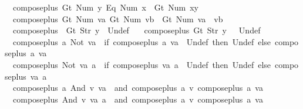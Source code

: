 \begin{isabellebody}
\ \ {\isachardoublequoteopen}compose{\isacharunderscore}plus\ {\isacharparenleft}Gt\ {\isacharparenleft}Num\ y{\isacharparenright}{\isacharparenright}\ {\isacharparenleft}Eq\ {\isacharparenleft}Num\ x{\isacharparenright}{\isacharparenright}\ {\isacharequal}\ Gt\ {\isacharparenleft}Num\ {\isacharparenleft}x{\isacharplus}y{\isacharparenright}{\isacharparenright}{\isachardoublequoteclose}\ {\isacharbar}\isanewline
\ \ {\isachardoublequoteopen}compose{\isacharunderscore}plus\ {\isacharparenleft}Gt\ {\isacharparenleft}Num\ va{\isacharparenright}{\isacharparenright}\ {\isacharparenleft}Gt\ {\isacharparenleft}Num\ vb{\isacharparenright}{\isacharparenright}\ {\isacharequal}\ Gt\ {\isacharparenleft}Num\ {\isacharparenleft}va\ {\isacharplus}\ vb{\isacharparenright}{\isacharparenright}{\isachardoublequoteclose}\ {\isacharbar}\isanewline
\ \ {\isachardoublequoteopen}compose{\isacharunderscore}plus\ {\isacharunderscore}\ {\isacharparenleft}Gt\ {\isacharparenleft}Str\ y{\isacharparenright}{\isacharparenright}\ {\isacharequal}\ Undef{\isachardoublequoteclose}\ {\isacharbar}\isanewline
\ \ {\isachardoublequoteopen}compose{\isacharunderscore}plus\ {\isacharparenleft}Gt\ {\isacharparenleft}Str\ y{\isacharparenright}{\isacharparenright}\ {\isacharunderscore}\ {\isacharequal}\ Undef{\isachardoublequoteclose}\ {\isacharbar}\isanewline
\ \ {\isachardoublequoteopen}compose{\isacharunderscore}plus\ a\ {\isacharparenleft}Not\ va{\isacharparenright}\ {\isacharequal}\ {\isacharparenleft}if\ {\isacharparenleft}compose{\isacharunderscore}plus\ a\ va{\isacharparenright}\ {\isacharequal}\ Undef\ then\ Undef\ else\ {\isacharparenleft}compose{\isacharunderscore}plus\ a\ va{\isacharparenright}{\isacharparenright}{\isachardoublequoteclose}\ {\isacharbar}\isanewline
\ \ {\isachardoublequoteopen}compose{\isacharunderscore}plus\ {\isacharparenleft}Not\ va{\isacharparenright}\ a\ {\isacharequal}\ {\isacharparenleft}if\ {\isacharparenleft}compose{\isacharunderscore}plus\ va\ a{\isacharparenright}\ {\isacharequal}\ Undef\ then\ Undef\ else\ {\isacharparenleft}compose{\isacharunderscore}plus\ va\ a{\isacharparenright}{\isacharparenright}{\isachardoublequoteclose}\ {\isacharbar}\isanewline
\ \ {\isachardoublequoteopen}compose{\isacharunderscore}plus\ a\ {\isacharparenleft}And\ v\ va{\isacharparenright}\ {\isacharequal}\ and\ {\isacharparenleft}compose{\isacharunderscore}plus\ a\ v{\isacharparenright}\ {\isacharparenleft}compose{\isacharunderscore}plus\ a\ va{\isacharparenright}{\isachardoublequoteclose}\ {\isacharbar}\isanewline
\ \ {\isachardoublequoteopen}compose{\isacharunderscore}plus\ {\isacharparenleft}And\ v\ va{\isacharparenright}\ a\ {\isacharequal}\ and\ {\isacharparenleft}compose{\isacharunderscore}plus\ a\ v{\isacharparenright}\ {\isacharparenleft}compose{\isacharunderscore}plus\ a\ va{\isacharparenright}{\isachardoublequoteclose}\isanewline

\end{isabellebody}
